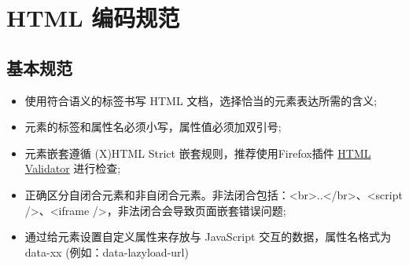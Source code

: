 \documentclass[letterpaper,10pt,english]{sphinxmanual}
\begin{document}
\section{HTML 编码规范}
\label{styleguide/html-coding-style:styleguide-htmlcodingstyle}\label{styleguide/html-coding-style:html}\label{styleguide/html-coding-style::doc}

\subsection{基本规范}
\label{styleguide/html-coding-style:id1}\begin{itemize}
\item {}
使用符合语义的标签书写 HTML 文档，选择恰当的元素表达所需的含义;

\item {}
元素的标签和属性名必须小写，属性值必须加双引号;

\item {}
元素嵌套遵循 (X)HTML Strict 嵌套规则，推荐使用Firefox插件 \href{http://www.w3.org/TR/html4/}{HTML Validator} 进行检查;

\item {}
正确区分自闭合元素和非自闭合元素。非法闭合包括：\textless{}br\textgreater{}..\textless{}/br\textgreater{}、\textless{}script /\textgreater{}、\textless{}iframe /\textgreater{}，非法闭合会导致页面嵌套错误问题;

\item {}
通过给元素设置自定义属性来存放与 JavaScript 交互的数据，属性名格式为 data-xx (例如：data-lazyload-url)

\end{itemize}
\end{document}
